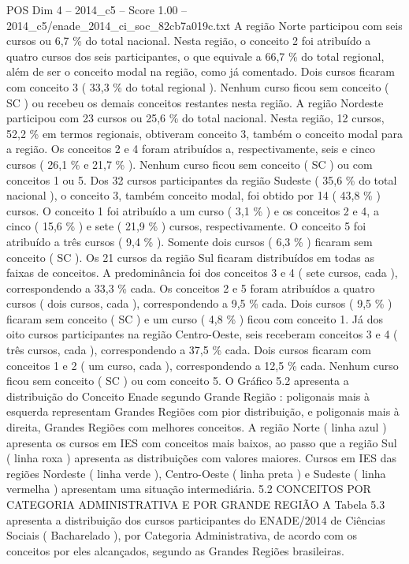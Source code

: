 \begin{textsample}{POS Dim 4 – 2014\_c5 – Score 1.00 – 2014\_c5/enade\_2014\_ci\_soc\_82cb7a019c.txt}
A região Norte participou com seis cursos ou 6,7 \% do total nacional.
Nesta região, o conceito 2 foi atribuído a quatro cursos dos seis participantes, o que equivale a 66,7 \% do total regional, além de ser o conceito modal na região, como já comentado.
Dois cursos ficaram com conceito 3 ( 33,3 \% do total regional ).
Nenhum curso ficou sem conceito ( SC ) ou recebeu os demais conceitos restantes nesta região.
A região Nordeste participou com 23 cursos ou 25,6 \% do total nacional.
Nesta região, 12 cursos, 52,2 \% em termos regionais, obtiveram conceito 3, também o conceito modal para a região.
Os conceitos 2 e 4 foram atribuídos a, respectivamente, seis e cinco cursos ( 26,1 \% e 21,7 \% ).
Nenhum curso ficou sem conceito ( SC ) ou com conceitos 1 ou 5.
Dos 32 cursos participantes da região Sudeste ( 35,6 \% do total nacional ), o conceito 3, também conceito modal, foi obtido por 14 ( 43,8 \% ) cursos.
O conceito 1 foi atribuído a um curso ( 3,1 \% ) e os conceitos 2 e 4, a cinco ( 15,6 \% ) e sete ( 21,9 \% ) cursos, respectivamente.
O conceito 5 foi atribuído a três cursos ( 9,4 \% ).
Somente dois cursos ( 6,3 \% ) ficaram sem conceito ( SC ).
Os 21 cursos da região Sul ficaram distribuídos em todas as faixas de conceitos.
A predominância foi dos conceitos 3 e 4 ( sete cursos, cada ), correspondendo a 33,3 \% cada.
Os conceitos 2 e 5 foram atribuídos a quatro cursos ( dois cursos, cada ), correspondendo a 9,5 \% cada.
Dois cursos ( 9,5 \% ) ficaram sem conceito ( SC ) e um curso ( 4,8 \% ) ficou com conceito 1.
Já dos oito cursos participantes na região Centro-Oeste, seis receberam conceitos 3 e 4 ( três cursos, cada ), correspondendo a 37,5 \% cada.
Dois cursos ficaram com conceitos 1 e 2 ( um curso, cada ), correspondendo a 12,5 \% cada.
Nenhum curso ficou sem conceito ( SC ) ou com conceito 5.
O Gráfico 5.2 apresenta a distribuição do Conceito Enade segundo Grande Região : poligonais mais à esquerda representam Grandes Regiões com pior distribuição, e poligonais mais à direita, Grandes Regiões com melhores conceitos.
A região Norte ( linha azul ) apresenta os cursos em IES com conceitos mais baixos, ao passo que a região Sul ( linha roxa ) apresenta as distribuições com valores maiores.
Cursos em IES das regiões Nordeste ( linha verde ), Centro-Oeste ( linha preta ) e Sudeste ( linha vermelha ) apresentam uma situação intermediária. 5.2 CONCEITOS POR CATEGORIA ADMINISTRATIVA E POR GRANDE REGIÃO A Tabela 5.3 apresenta a distribuição dos cursos participantes do ENADE/2014 de Ciências Sociais ( Bacharelado ), por Categoria Administrativa, de acordo com os conceitos por eles alcançados, segundo as Grandes Regiões brasileiras.

\end{textsample}

